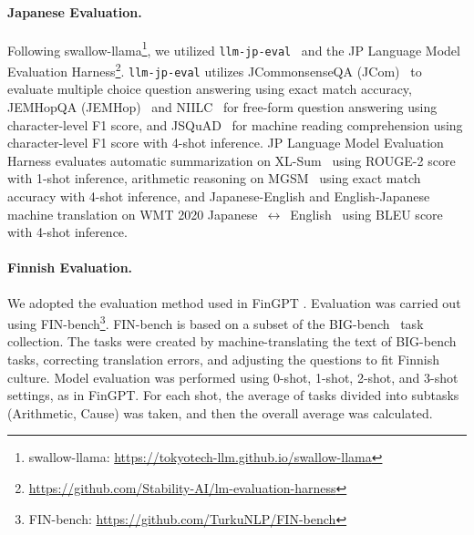 \paragraph{Japanese Evaluation.}
Following swallow-llama\footnote{swallow-llama: \url{https://tokyotech-llm.github.io/swallow-llama}}, we utilized \texttt{llm-jp-eval}~\citep{han-etal-2024-llm-jp-eval} and the JP Language Model Evaluation Harness\footnote{\url{https://github.com/Stability-AI/lm-evaluation-harness}}. \texttt{llm-jp-eval} utilizes JCommonsenseQA (JCom)~\citep{kurihara-etal-2022-jglue} to evaluate multiple choice question answering using exact match accuracy, JEMHopQA (JEMHop)~\citep{ishi-etal-2023-jemhopqa} and NIILC~\citep{sekine-etal-2003-niilc} for free-form question answering using character-level F1 score, and JSQuAD~\citep{kurihara-etal-2022-jglue} for machine reading comprehension using character-level F1 score with 4-shot inference. JP Language Model Evaluation Harness evaluates automatic summarization on XL-Sum~\citep{hasan-etal-2021-xlsum} using ROUGE-2 score with 1-shot inference, arithmetic reasoning on MGSM~\citep{shi-etal-2022-mgsm} using exact match accuracy with 4-shot inference, and Japanese-English and English-Japanese machine translation on WMT 2020 Japanese~$\leftrightarrow$~English~\citep{barrault-etal-2020-findings-wmt20} using BLEU score with 4-shot inference.

\paragraph{Finnish Evaluation.}
We adopted the evaluation method used in FinGPT \citep{luukkonen-etal-2023-fingpt}.
Evaluation was carried out using FIN-bench\footnote{FIN-bench: \url{https://github.com/TurkuNLP/FIN-bench}}. FIN-bench is based on a subset of the BIG-bench~\citep{srivastava2023imitation} task collection. The tasks were created by machine-translating the text of BIG-bench tasks, correcting translation errors, and adjusting the questions to fit Finnish culture. %
Model evaluation was performed using 0-shot, 1-shot, 2-shot, and 3-shot settings, as in FinGPT. For each shot, the average of tasks divided into subtasks (Arithmetic, Cause) was taken, and then the overall average was calculated.

